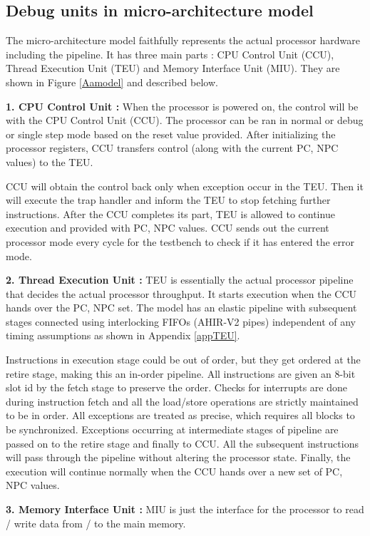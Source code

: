 \subsection{Debug units in micro-architecture model}
The micro-architecture model faithfully represents the actual processor hardware including the pipeline. It has three main parts : CPU Control Unit (CCU), Thread Execution Unit (TEU) and Memory Interface Unit (MIU).  They are shown in Figure \ref{Aamodel} and described below.

\begin{description}
	\item \textbf{1. CPU Control Unit :} When the processor is powered on, the control will be with the CPU Control Unit (CCU). The processor can be ran in normal or debug or single step mode based on the reset value provided. After initializing the processor registers, CCU transfers control (along with the current PC, NPC values) to the TEU.
	
	CCU will obtain the control back only when exception occur in the TEU. Then it will execute the trap handler and inform the TEU to stop fetching further instructions. After the CCU completes its part, TEU is allowed to continue execution and provided with PC, NPC values. CCU sends out the current processor mode every cycle for the testbench to check if it has entered the error mode.
	
	\item \textbf{2. Thread Execution Unit :} TEU is essentially the actual processor pipeline that decides the actual processor throughput. It starts execution when the CCU hands over the PC, NPC set. The model has an elastic pipeline with subsequent stages connected using interlocking FIFOs (AHIR-V2 pipes) independent of any timing assumptions as shown in Appendix \ref{appTEU}.
	
	Instructions in execution stage could be out of order, but they get ordered at the retire stage, making this an in-order pipeline. All instructions are given an 8-bit slot id by the fetch stage to preserve the order. Checks for interrupts are done during instruction fetch and all the load/store operations are strictly maintained to be in order. All exceptions are treated as precise, which requires all blocks to be synchronized. Exceptions occurring at intermediate stages of pipeline are passed on to the retire stage and finally to CCU. All the subsequent instructions will pass through the pipeline without altering the processor state. Finally, the execution will continue normally when the CCU hands over a new set of PC, NPC values.
	
	\item \textbf{3. Memory Interface Unit :} MIU is just the interface for the processor to read / write data from / to the main memory.
\end{description}



